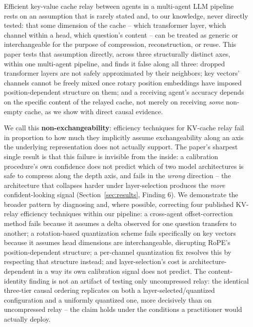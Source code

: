 \documentclass[11pt]{article}
\begin{document}
Efficient key-value cache relay between agents in a multi-agent LLM
pipeline rests on an assumption that is rarely stated and, to our
knowledge, never directly tested: that some dimension of the cache -- which
transformer layer, which channel within a head, which question's content --
can be treated as generic or interchangeable for the purpose of
compression, reconstruction, or reuse. This paper tests that assumption
directly, across three structurally distinct axes, within one multi-agent
pipeline, and finds it false along all three: dropped transformer layers
are not safely approximated by their neighbors; key vectors' channels
cannot be freely mixed once rotary position embeddings have imposed
position-dependent structure on them; and a receiving agent's accuracy
depends on the specific content of the relayed cache, not merely on
receiving \emph{some} non-empty cache, as we show with direct causal
evidence.

We call this \textbf{non-exchangeability}: efficiency techniques for
KV-cache relay fail in proportion to how much they implicitly assume
exchangeability along an axis the underlying representation does not
actually support. The paper's sharpest single result is that this failure
is invisible from the inside: a calibration procedure's own confidence
does not predict which of two model architectures is safe to compress
along the depth axis, and fails in the \emph{wrong} direction -- the
architecture that collapses harder under layer-selection produces the
\emph{more} confident-looking signal (Section~\ref{sec:results}, Finding
6). We demonstrate the broader pattern by diagnosing and, where possible,
correcting four published KV-relay efficiency techniques within our
pipeline: a cross-agent offset-correction method \citep{kvcomm2025} fails
because it assumes a delta observed for one question transfers to
another; a rotation-based quantization scheme
\citep{turboquant2026,polarquant2026} fails specifically on key vectors
because it assumes head dimensions are interchangeable, disrupting RoPE's
position-dependent structure; a per-channel quantization fix
\citep{kivi2024} resolves this by respecting that structure instead; and
layer-selection's cost is architecture-dependent in a way its own
calibration signal does not predict. The content-identity finding is not
an artifact of testing only uncompressed relay: the identical three-tier
causal ordering replicates on both a layer-selected/quantized
configuration and a uniformly quantized one, more decisively than on
uncompressed relay -- the claim holds under the conditions a practitioner
would actually deploy.
\end{document}
